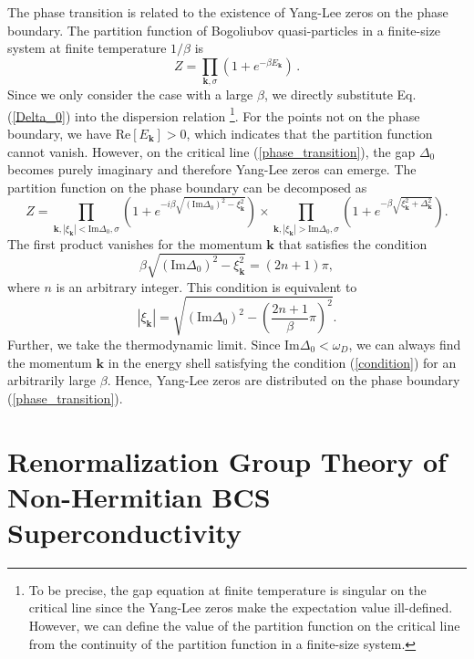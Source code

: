 \documentclass[aps,onecolumn,superscriptaddress,notitlepage,longbibliography]{revtex4-1}
\begin{document}
The phase transition is related to the existence of Yang-Lee zeros on the phase boundary. The partition function of Bogoliubov quasi-particles in a finite-size system at finite temperature $1/\beta$ is
\begin{equation}
  Z = \prod_{\bm{k},\sigma} (1 + e^{-\beta E_{\bm{k}}})\,.
\end{equation}
 Since we only consider the case with a large $\beta$, we directly substitute Eq. (\ref{Delta_0}) into the dispersion relation \footnote{To be precise, the gap equation at finite temperature is singular on the critical line since the Yang-Lee zeros make the expectation value ill-defined. However, we can define the value of the partition function on the critical line from the continuity of the partition function in a finite-size system.}. For the points not on the phase boundary, we have $\text{Re}
 [E_{\bm{k}}] > 0$, which indicates that the
 partition function cannot vanish. However, on the critical line (\ref{phase_transition}), the gap $\Delta_0$ becomes purely imaginary and therefore Yang-Lee zeros can emerge. The partition function on the phase boundary can be decomposed as
\begin{equation}
  Z = \prod_{\bm{k},|\xi_{\bm{k}}|<\text{Im}\Delta_0,\sigma} \left( 1 + e^{- i \beta \sqrt{\left( \text{Im}\Delta_0 \right)^2 - \xi_{\bm{k}}^2}} \right)\times \prod_{\bm{k},|\xi_{\bm{k}}|>\text{Im}\Delta_0,\sigma}\left( 1 + e^{- \beta \sqrt{\xi_{\bm{k}}^2 +\Delta_{\bm{k}}^2 }} \right).
\end{equation}
The first product vanishes for the momentum $\bm{k}$ that satisfies the condition
\begin{equation}
  \beta \sqrt{\left( \text{Im} \Delta_0 \right)^2 - \xi_{\bm{k}}^2} = (2n + 1) \pi,
\end{equation}
where $n$ is an arbitrary integer. This condition is equivalent to
\begin{equation}
 |\xi_{\bm{k}}| = \sqrt{\left( \text{Im} \Delta_0
  \right)^2 - \left( \frac{2 n + 1}{\beta} \pi \right)^2}.
  \label{condition}
\end{equation}
 Further, we take the thermodynamic limit. Since $\text{Im}\Delta_0<\omega_D$, we can always find the momentum $\bm{k}$ in the energy shell satisfying the condition (\ref{condition}) for an arbitrarily large $\beta$. Hence, Yang-Lee zeros are distributed on the phase boundary (\ref{phase_transition}). 

 \section{Renormalization Group Theory of Non-Hermitian BCS Superconductivity}\label{RG}
\end{document}
